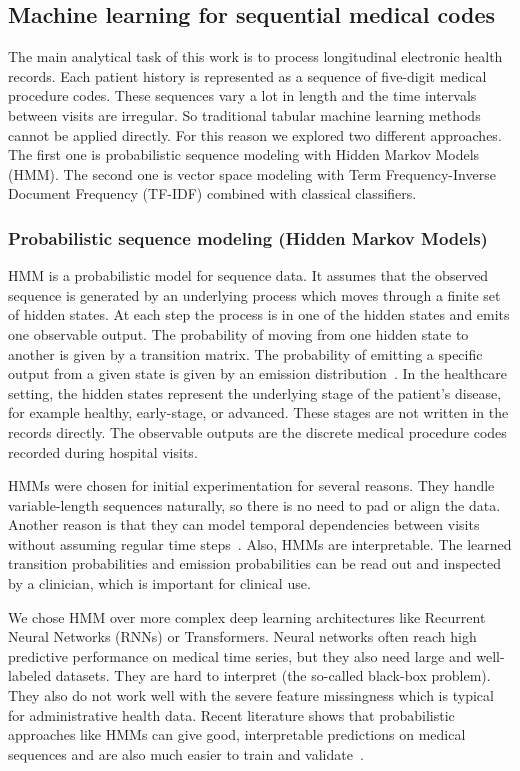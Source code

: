 \subsection{Machine learning for sequential medical codes}
\label{subsec:ml_methods}

The main analytical task of this work is to process longitudinal electronic health records. Each patient history is represented as a sequence of five-digit medical procedure codes. These sequences vary a lot in length and the time intervals between visits are irregular. So traditional tabular machine learning methods cannot be applied directly. For this reason we explored two different approaches. The first one is probabilistic sequence modeling with Hidden Markov Models (HMM). The second one is vector space modeling with Term Frequency-Inverse Document Frequency (TF-IDF) combined with classical classifiers.

\subsubsection{Probabilistic sequence modeling (Hidden Markov Models)}
HMM is a probabilistic model for sequence data. It assumes that the observed sequence is generated by an underlying process which moves through a finite set of hidden states. At each step the process is in one of the hidden states and emits one observable output. The probability of moving from one hidden state to another is given by a transition matrix. The probability of emitting a specific output from a given state is given by an emission distribution~\cite{hmm_medical_time_series_2022}. In the healthcare setting, the hidden states represent the underlying stage of the patient's disease, for example healthy, early-stage, or advanced. These stages are not written in the records directly. The observable outputs are the discrete medical procedure codes recorded during hospital visits.

HMMs were chosen for initial experimentation for several reasons. They handle variable-length sequences naturally, so there is no need to pad or align the data. Another reason is that they can model temporal dependencies between visits without assuming regular time steps~\cite{hmm_bioinformatics_2025}. Also, HMMs are interpretable. The learned transition probabilities and emission probabilities can be read out and inspected by a clinician, which is important for clinical use.

We chose HMM over more complex deep learning architectures like Recurrent Neural Networks (RNNs) or Transformers. Neural networks often reach high predictive performance on medical time series, but they also need large and well-labeled datasets. They are hard to interpret (the so-called black-box problem). They also do not work well with the severe feature missingness which is typical for administrative health data. Recent literature shows that probabilistic approaches like HMMs can give good, interpretable predictions on medical sequences and are also much easier to train and validate~\cite{hmm_medical_time_series_2022}.

